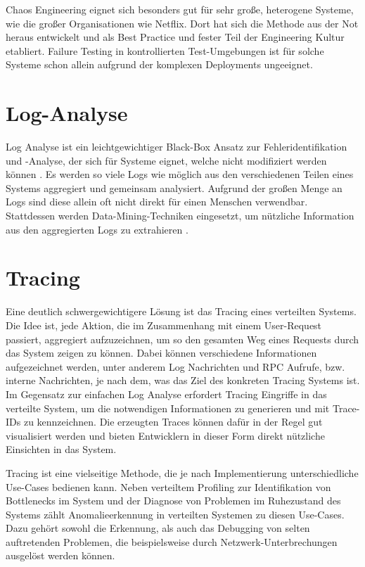 \documentclass[12pt,a4paper]{report}
\begin{document}
Chaos Engineering eignet sich besonders gut für sehr große, heterogene Systeme, wie die großer Organisationen wie Netflix. Dort hat
sich die Methode aus der Not heraus entwickelt und als Best Practice und fester Teil der Engineering Kultur etabliert. Failure Testing in
kontrollierten Test-Umgebungen ist für solche Systeme schon allein aufgrund der komplexen Deployments ungeeignet.
\cite{chaos_engineering}

\section{Log-Analyse}
Log Analyse ist ein leichtgewichtiger Black-Box Ansatz zur Fehleridentifikation und -Analyse, der sich für Systeme eignet, welche
nicht modifiziert werden können \cite{challenges_and_options}. Es werden so viele Logs wie möglich aus den
verschiedenen Teilen eines Systems aggregiert und gemeinsam analysiert. Aufgrund der großen Menge an Logs sind diese allein oft
nicht direkt für einen Menschen verwendbar. Stattdessen werden Data-Mining-Techniken eingesetzt, um nützliche Information aus den
aggregierten Logs zu extrahieren \cite{log_analysis_at_google}.

\section{Tracing}
Eine deutlich schwergewichtigere Lösung ist das Tracing eines verteilten Systems. Die Idee ist, jede Aktion, die im Zusammenhang
mit einem User-Request passiert, aggregiert aufzuzeichnen, um so den gesamten Weg eines Requests durch das System zeigen zu können.
Dabei können verschiedene Informationen aufgezeichnet werden, unter anderem Log Nachrichten und RPC Aufrufe, bzw. interne
Nachrichten, je nach dem, was das Ziel des konkreten Tracing Systems ist. Im Gegensatz zur einfachen Log Analyse erfordert Tracing
Eingriffe in das verteilte System, um die notwendigen Informationen zu generieren und mit Trace-IDs zu kennzeichnen. Die erzeugten
Traces können dafür in der Regel gut visualisiert werden und bieten Entwicklern in dieser Form direkt nützliche Einsichten in das
System. \cite{dapper_tracing}

Tracing ist eine vielseitige Methode, die je nach Implementierung unterschiedliche Use-Cases bedienen kann. Neben verteiltem
Profiling zur Identifikation von Bottlenecks im System und der Diagnose von Problemen im Ruhezustand des Systems zählt
Anomalieerkennung in verteilten Systemen zu diesen Use-Cases. Dazu gehört sowohl die Erkennung, als auch das Debugging von selten
auftretenden Problemen, die beispielsweise durch Netzwerk-Unterbrechungen ausgelöst werden können. \cite{so_you_want_to_trace}
\end{document}
